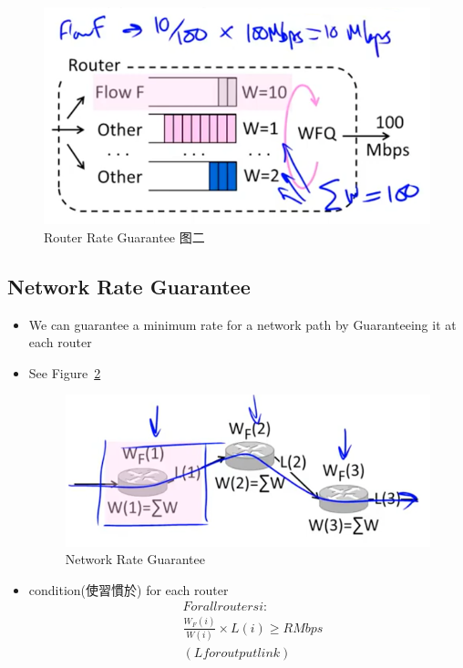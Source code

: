 \documentclass[12pt]{ctexart}   %
\begin{document}
\begin{itemize}
		\begin{figure}[h!] %
		\centering
		\includegraphics[scale=0.7]{images/9-7-4}
		\caption{ Router Rate Guarantee  图二}
		\label{fig:9-7-4}
		\end{figure}

	\end{itemize}

	\subsection{Network Rate Guarantee}
	\begin{itemize}
		\item We can guarantee a minimum rate for a network path by Guaranteeing it at each router
		\item See Figure~\ref{fig:9-7-5}
		  
		\begin{figure}[h!] %
		\centering
		\includegraphics[scale=0.7]{images/9-7-5}
		\caption{ Network Rate Guarantee}
		\label{fig:9-7-5}
		\end{figure}

		\item condition(使習慣於) for each router
		\begin{equation}
			\begin{split}
				& For all routers i: \\
				& \frac{W_{F}(i)}{W(i)} \times L(i) \geqslant R Mbps \\
				& (L for output link)
			\end{split}
		\end{equation}
	\end{itemize}
\end{document}
